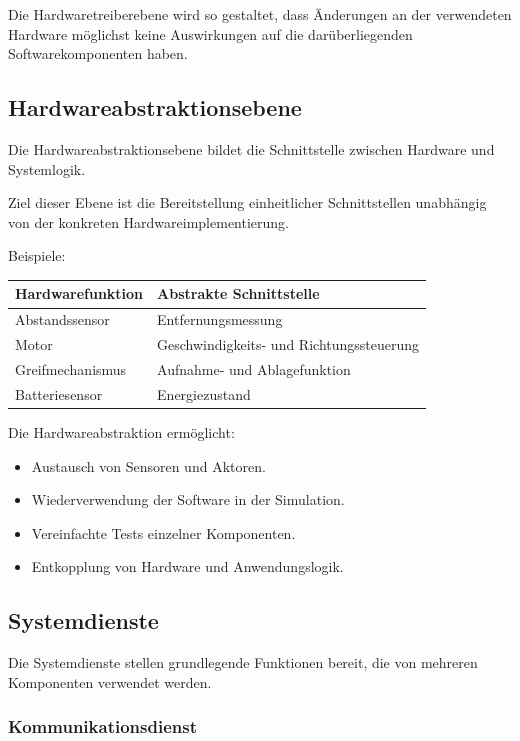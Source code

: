 Die Hardwaretreiberebene wird so gestaltet, dass Änderungen an der
verwendeten Hardware möglichst keine Auswirkungen auf die
darüberliegenden Softwarekomponenten haben.

\subsection{Hardwareabstraktionsebene}\label{hardwareabstraktionsebene-1}

Die Hardwareabstraktionsebene bildet die Schnittstelle zwischen Hardware
und Systemlogik.

Ziel dieser Ebene ist die Bereitstellung einheitlicher Schnittstellen
unabhängig von der konkreten Hardwareimplementierung.

Beispiele:

\begin{longtable}[]{@{}ll@{}}
\toprule\noalign{}
Hardwarefunktion & Abstrakte Schnittstelle \\
\midrule\noalign{}
\endhead
\bottomrule\noalign{}
\endlastfoot
Abstandssensor & Entfernungsmessung \\
Motor & Geschwindigkeits- und Richtungssteuerung \\
Greifmechanismus & Aufnahme- und Ablagefunktion \\
Batteriesensor & Energiezustand \\
\end{longtable}

Die Hardwareabstraktion ermöglicht:

\begin{itemize}
\tightlist
\item
  Austausch von Sensoren und Aktoren.
\item
  Wiederverwendung der Software in der Simulation.
\item
  Vereinfachte Tests einzelner Komponenten.
\item
  Entkopplung von Hardware und Anwendungslogik.
\end{itemize}

\subsection{Systemdienste}\label{systemdienste}

Die Systemdienste stellen grundlegende Funktionen bereit, die von
mehreren Komponenten verwendet werden.

\subsubsection{Kommunikationsdienst}\label{kommunikationsdienst}

